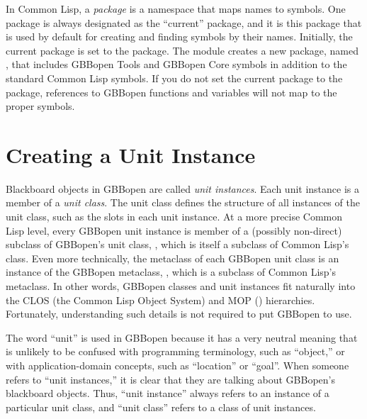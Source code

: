 \documentclass[10pt,twoside,english,pdftex]{article}
\begin{document}
In Common Lisp, a \textit{package\/} is a namespace that maps names to
symbols.  One package is always designated as the ``current'' package, and it
is this package that is used by default for creating and finding symbols by
their names.  Initially, the current package is set to the
 package.  The 
module creates a new package, named , that includes
GBBopen Tools and GBBopen Core symbols in addition to the standard Common Lisp
symbols.  If you do not set the current package to the
 package, references to GBBopen functions and
variables will not map to the proper symbols.


\T\markright{}%
\T\pagestyle{plain}
\T\cleardoublepage
\W{}
\T\pagestyle{fancy}
\T\thispagestyle{fancybottom}
\T\renewcommand{\headrulewidth}{0pt}
\section{Creating a Unit Instance}
\label{sec:unit-instance}%

Blackboard objects in GBBopen are called \textit{unit instances}. Each unit
instance is a member of a \textit{unit class}.  The unit class defines the
structure of all instances of the unit class, such as the slots in each unit
instance.  At a more precise Common Lisp level, every GBBopen unit instance is
member of a (possibly non-direct) subclass of GBBopen's unit class,
, which is itself a subclass of Common
Lisp's  class.  Even more technically, the
metaclass of each GBBopen unit class is an instance of the GBBopen metaclass,
, which is a subclass of Common Lisp's
 metaclass.  In other words, GBBopen classes and
unit instances fit naturally into the CLOS (the Common Lisp Object System) and
MOP ()
hierarchies. Fortunately, understanding such details is not required to put
GBBopen to use.

The word ``unit'' is used in GBBopen because it has a very neutral meaning
that is unlikely to be confused with programming terminology, such as
``object,'' or with application-domain concepts, such as ``location'' or
``goal''.  When someone refers to ``unit instances,'' it is clear that they
are talking about GBBopen's blackboard objects.  Thus, ``unit instance''
always refers to an instance of a particular unit class, and ``unit class''
refers to a class of unit instances.
\end{document}
